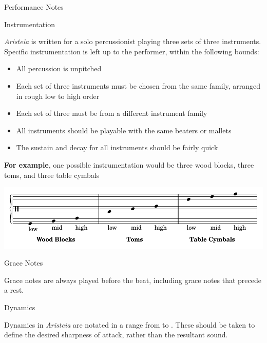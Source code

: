 \documentclass{article}
\begin{document}
\begin{center}
  {\Huge Performance Notes }
\end{center}

{\large Instrumentation}

\textit{Aristeia} is written for a solo percussionist playing three sets of three instruments.
Specific instrumentation is left up to the performer, within the following bounds:

\begin{itemize}
  \item All percussion is unpitched
  \item Each set of three instruments must be chosen from the same family, arranged in rough low to high order
  \item Each set of three must be from a different instrument family
  \item All instruments should be playable with the same beaters or mallets
  \item The sustain and decay for all instruments should be fairly quick
\end{itemize}

{\bf For example}, one possible instrumentation would be three wood blocks, three toms, and three table cymbals

\begin{center}
  \includegraphics[scale=.8]{./nonagram-crop.pdf}
\end{center}


{\large Grace Notes}

Grace notes are always played before the beat, including grace notes that precede a rest.


{\large Dynamics}

Dynamics in \textit{Aristeia} are notated in a range from  to . These should be taken to define the desired sharpness of attack, rather than the resultant sound.
\end{document}
